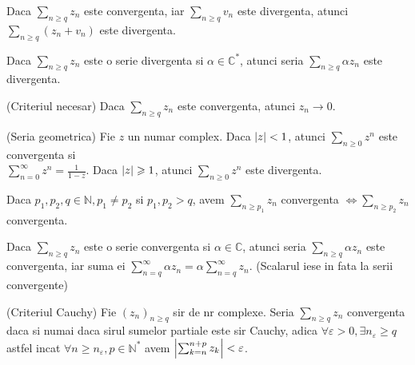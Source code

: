 \documentclass{article}
\begin{document}
\begin{enumerate}
\proprietate Daca $\sum_{n \geq q} z_n$ este convergenta, iar $\sum_{n \geq q} v_n$ este divergenta, atunci $\sum_{n \geq q} (z_n + v_n)$ este divergenta.

\proprietate Daca $\sum_{n \geq q} z_n$ este o serie divergenta si $\alpha \in \mathbb{C}^*$, atunci seria $\sum_{n \geq q} \alpha z_n$ este divergenta.

\begin{tcolorbox}
\propozitie (Criteriul necesar) Daca $\sum_{n \geq q} z_n$ este convergenta, atunci $z_n \to 0$.
\end{tcolorbox}

\propozitie (Seria geometrica) Fie $z$ un numar complex. Daca $\left\lvert z \right\rvert < 1$, atunci $\sum_{n \geq 0} z^n$ este convergenta si \\ $\sum_{n = 0}^{\infty} z^n = \frac{1}{1-z}$. Daca $\left\lvert z \right\rvert \geqslant 1$, atunci $\sum_{n \geq 0} z^n$ este divergenta.

\observatie Daca $p_1, p_2, q \in \mathbb{N}, p_1 \neq p_2$ si $p_1, p_2 > q$, avem $\sum_{n \geq p_1} z_n$ convergenta $\Leftrightarrow \sum_{n \geq p_2} z_n$ convergenta.


\corolar Daca $\sum_{n \geq q} z_n$ este o serie convergenta si $\alpha \in \mathbb{C}$, atunci seria $\sum_{n \geq q} \alpha z_n$ este convergenta, iar suma ei $\sum_{n = q}^{\infty} \alpha z_n = \alpha \sum_{n = q}^{\infty} z_n $. (Scalarul iese in fata la serii convergente)




\propozitie (Criteriul Cauchy) Fie $(z_n)_{n \geq q}$ sir de nr complexe. Seria $\sum_{n \geq q} z_n$ convergenta daca si numai daca sirul sumelor partiale este sir Cauchy, adica $\forall \varepsilon > 0, \exists n_{\varepsilon} \geq q$ astfel incat $\forall n \geq n_{\varepsilon}, p \in \mathbb{N}^*$ avem $\left\lvert \sum_{k= n}^{n+p} z_k \right\rvert < \varepsilon$.



\end{enumerate}
\end{document}
